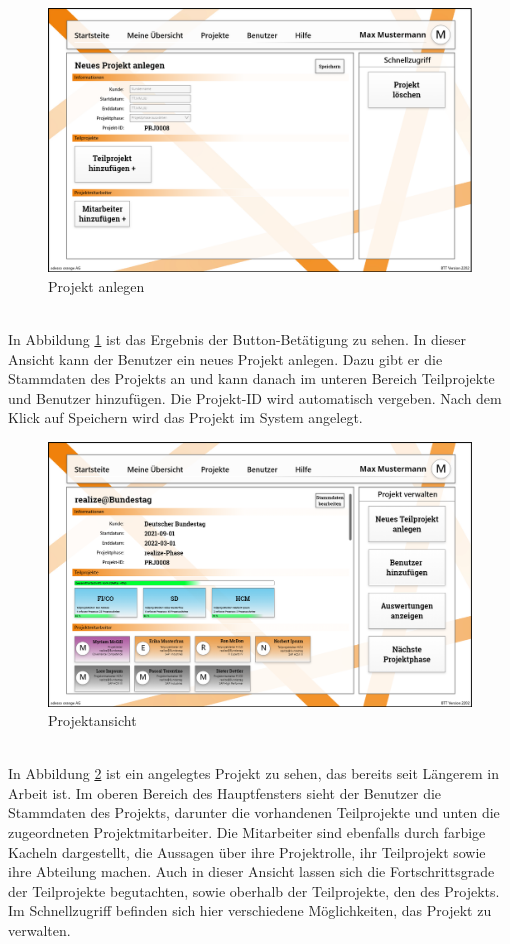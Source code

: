 \begin{figure}[h!]
    \centering
    \includegraphics[scale=0.35]{./Prototyp/042_Projekt bearbeiten.png}
    \caption[Prototyp: Projekt anlegen]{Projekt anlegen}
    \label{fig:ProjektAnlegen}
\end{figure}
\\In Abbildung \ref{fig:ProjektAnlegen} ist das Ergebnis der Button-Betätigung zu sehen. In dieser Ansicht kann der Benutzer ein neues Projekt anlegen. Dazu gibt er die Stammdaten des Projekts an und kann danach im unteren Bereich Teilprojekte und Benutzer hinzufügen. Die Projekt-ID wird automatisch vergeben. Nach dem Klick auf \glqq{}Speichern\grqq{} wird das Projekt im System angelegt. 
\begin{figure}[h!]
    \centering
    \includegraphics[scale=0.35]{./Prototyp/041_Projekt Ansicht.png}
    \caption[Prototyp: Projektansicht]{Projektansicht}
    \label{fig:Projektansicht}
\end{figure}
\\In Abbildung \ref{fig:Projektansicht} ist ein angelegtes Projekt zu sehen, das bereits seit Längerem in Arbeit ist. Im oberen Bereich des Hauptfensters sieht der Benutzer die Stammdaten des Projekts, darunter die vorhandenen Teilprojekte und unten die zugeordneten Projektmitarbeiter. Die Mitarbeiter sind ebenfalls durch farbige Kacheln dargestellt, die Aussagen über ihre Projektrolle, ihr Teilprojekt sowie ihre Abteilung machen. Auch in dieser Ansicht lassen sich die Fortschrittsgrade der Teilprojekte begutachten, sowie oberhalb der Teilprojekte, den des Projekts. Im Schnellzugriff befinden sich hier verschiedene Möglichkeiten, das Projekt zu verwalten.
